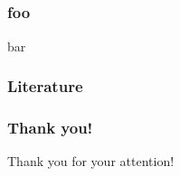 \documentclass[12pt]{beamer}
\begin{document}
\subsection*{}
	\begin{frame}
		\frametitle{foo}
		bar
	\end{frame}
	\begin{frame}
	\frametitle{Literature}
		\nocite{*}
		\def\newblock{}
		
		
	\end{frame}

	\begin{frame}
		\frametitle{Thank you!}
		\begin{center}
			Thank you for your attention!
		\end{center}
	\end{frame}	
\end{document}
